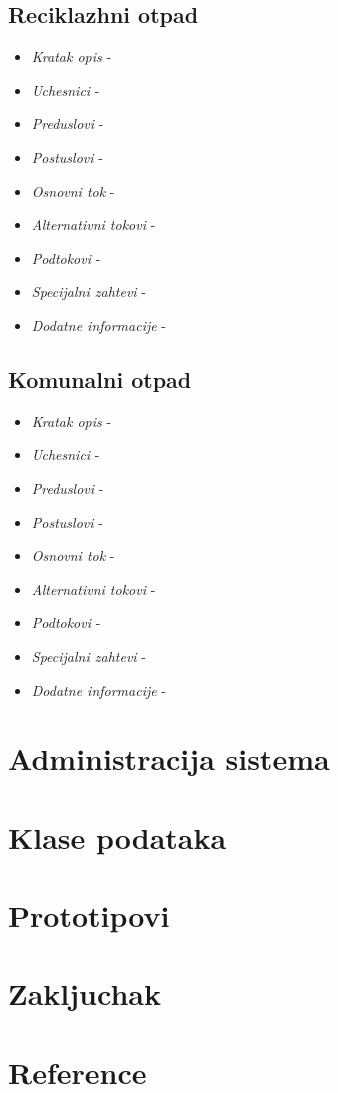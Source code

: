 \documentclass[10 pt]{article}
\begin{document}
\subsection{Reciklazhni otpad}

\begin{itemize}
	\item \textit{Kratak opis} - 
	\item \textit{Uchesnici} -
	\item \textit{Preduslovi} -
	\item \textit{Postuslovi} - 
	\item \textit{Osnovni tok} - 
	\item \textit{Alternativni tokovi} - 
	\item \textit{Podtokovi} - 
	\item \textit{Specijalni zahtevi} - 
	\item \textit{Dodatne informacije} - 
\end{itemize}

\subsection{Komunalni otpad}

\begin{itemize}
	\item \textit{Kratak opis} - 
	\item \textit{Uchesnici} -
	\item \textit{Preduslovi} -
	\item \textit{Postuslovi} - 
	\item \textit{Osnovni tok} - 
	\item \textit{Alternativni tokovi} - 
	\item \textit{Podtokovi} - 
	\item \textit{Specijalni zahtevi} - 
	\item \textit{Dodatne informacije} - 
\end{itemize}

\section{Administracija sistema}

\section{Klase podataka}

\section{Prototipovi}
\section{Zakljuchak}
\section{Reference}
\end{document}
